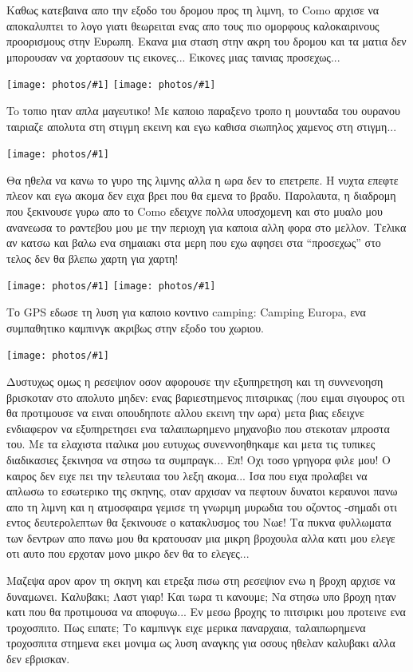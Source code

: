 \documentclass[11pt, letterpaper]{book}
\newcommand\photo[1]{\noindent\texttt{[image: photos/\#1]}}
\begin{document}
Καθως κατεβαινα απο την εξοδο του δρομου προς τη λιμνη, το Como αρχισε να αποκαλυπτει το λογο γιατι θεωρειται ενας απο τους πιο ομορφους καλοκαιρινους προορισμους στην Ευρωπη.
Εκανα μια σταση στην ακρη του δρομου και τα ματια δεν μπορουσαν να χορτασουν τις εικονες...
Εικονες μιας ταινιας προσεχως...

\photo{12.jpg}
\photo{13.jpg}

To τοπιο ηταν απλα μαγευτικο! Με καποιο παραξενο τροπο η μουνταδα του ουρανου ταιριαζε απολυτα στη στιγμη εκεινη και εγω καθισα σιωπηλος χαμενος στη στιγμη...

\photo{14.jpg}

Θα ηθελα να κανω το γυρο της λιμνης αλλα η ωρα δεν το επετρεπε. Η νυχτα επεφτε πλεον και εγω ακομα δεν ειχα βρει που θα εμενα το βραδυ. Παρολαυτα, η διαδρομη που ξεκινουσε γυρω απο το Como εδειχνε πολλα υποσχομενη και στο μυαλο μου ανανεωσα το ραντεβου μου με την περιοχη για καποια αλλη φορα στο μελλον. Τελικα αν κατσω και βαλω ενα σημαιακι στα μερη που εχω αφησει στα ``προσεχως'' στο τελος δεν θα βλεπω χαρτη για χαρτη!

\photo{15.jpg}
\photo{16.jpg}

Το GPS εδωσε τη λυση για καποιο κοντινο camping: Camping Europa, ενα συμπαθητικο καμπινγκ ακριβως στην εξοδο του χωριου.

\photo{17.jpg}

Δυστυχως ομως η ρεσεψιον οσον αφορουσε την εξυπηρετηση και τη συννενοηση βρισκοταν στο απολυτο μηδεν: ενας βαριεστημενος πιτσιρικας (που ειμαι σιγουρος οτι θα προτιμουσε να ειναι οπουδηποτε αλλου εκεινη την ωρα) μετα βιας εδειχνε ενδιαφερον να εξυπηρετησει ενα ταλαιπωρημενο μηχανοβιο που στεκοταν μπροστα του.
Με τα ελαχιστα ιταλικα μου ευτυχως συνεννοηθηκαμε και μετα τις τυπικες διαδικασιες ξεκινησα να στησω τα συμπραγκ... Επ! Οχι τοσο γρηγορα φιλε μου! Ο καιρος δεν ειχε πει την τελευταια του λεξη ακομα...
Ισα που ειχα προλαβει να απλωσω το εσωτερικο της σκηνης, οταν αρχισαν να πεφτουν δυνατοι κεραυνοι πανω απο τη λιμνη και η ατμοσφαιρα γεμισε τη γνωριμη μυρωδια του οζοντος -σημαδι οτι εντος δευτερολεπτων θα ξεκινουσε ο κατακλυσμος του Νωε!
Τα πυκνα φυλλωματα των δεντρων απο πανω μου θα κρατουσαν μια μικρη βροχουλα αλλα κατι μου ελεγε οτι αυτο που ερχοταν μονο μικρο δεν θα το ελεγες... 

Μαζεψα αρον αρον τη σκηνη και ετρεξα πισω στη ρεσεψιον ενω η βροχη αρχισε να δυναμωνει. 
Καλυβακι; Λαστ γιαρ! Και τωρα τι κανουμε; Να στησω υπο βροχη ηταν κατι που θα προτιμουσα να αποφυγω...
Εν μεσω βροχης το πιτσιρικι μου προτεινε ενα τροχοσπιτο. Πως ειπατε; 
Το καμπινγκ ειχε μερικα παναρχαια, ταλαιπωρημενα τροχοσπιτα στημενα εκει μονιμα ως λυση αναγκης για οσους ηθελαν καλυβακι αλλα δεν εβρισκαν.
\end{document}

